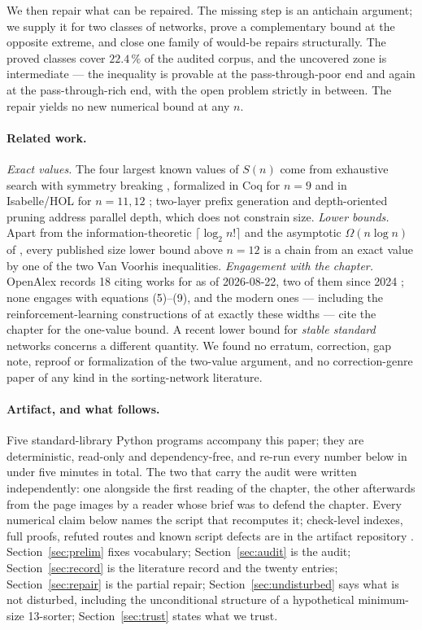 \documentclass[11pt,a4paper]{article}
\begin{document}
We then repair what can be repaired. The missing step is an antichain argument;
we supply it for two classes of networks, prove a complementary bound at the
opposite extreme, and close one family of would-be repairs structurally. The
proved classes cover $22.4\,\%$ of the audited corpus, and the uncovered zone is
intermediate --- the inequality is provable at the pass-through-poor end and
again at the pass-through-rich end, with the open problem strictly in between.
The repair yields no new numerical bound at any $n$.

\paragraph{Related work.}
\emph{Exact values.} The four largest known values of $S(n)$ come from
exhaustive search with symmetry breaking \cite{CCFS16,Ha20}, formalized in Coq
for $n=9$ \cite{CLS17,CS15} and in Isabelle/HOL for $n = 11,12$ \cite{Ha20};
two-layer prefix generation \cite{CCS14} and depth-oriented pruning
\cite{BZ14,EM14,MG15} address parallel depth, which does not constrain size.
\emph{Lower bounds.} Apart from the information-theoretic
$\lceil \log_2 n! \rceil$ and the asymptotic $\Omega(n \log n)$ of
\cite{KLM95}, every published size lower bound above $n = 12$ is a chain from an
exact value by one of the two Van Voorhis inequalities.
\emph{Engagement with the chapter.} OpenAlex records 18 citing works for
\cite{VV72} as of 2026-08-22, two of them since 2024 \cite{Vlad25,CS24}; none
engages with equations (5)--(9), and the modern ones --- including the
reinforcement-learning constructions of \cite{Vlad25,BR26} at exactly these
widths --- cite the chapter for the one-value bound. A recent lower bound for \emph{stable standard} networks
\cite{TS26} concerns a different quantity. We found no erratum, correction, gap
note, reproof or formalization of the two-value argument, and no
correction-genre paper of any kind in the sorting-network literature.

\paragraph{Artifact, and what follows.}
Five standard-library Python programs accompany this paper; they are
deterministic, read-only and dependency-free, and re-run every number below in
under five minutes in total. The two that carry the audit were
written independently: one alongside the first reading of the chapter, the other
afterwards from the page images by a reader whose brief was to defend the
chapter. Every numerical claim below names the script that recomputes it;
check-level indexes, full proofs, refuted routes and known script defects are in
the artifact repository \cite{Art}.
Section~\ref{sec:prelim} fixes vocabulary; Section~\ref{sec:audit} is the audit;
Section~\ref{sec:record} is the literature record and the twenty entries;
Section~\ref{sec:repair} is the partial repair; Section~\ref{sec:undisturbed}
says what is not disturbed, including the unconditional structure of a
hypothetical minimum-size 13-sorter; Section~\ref{sec:trust} states what we
trust.
\end{document}
